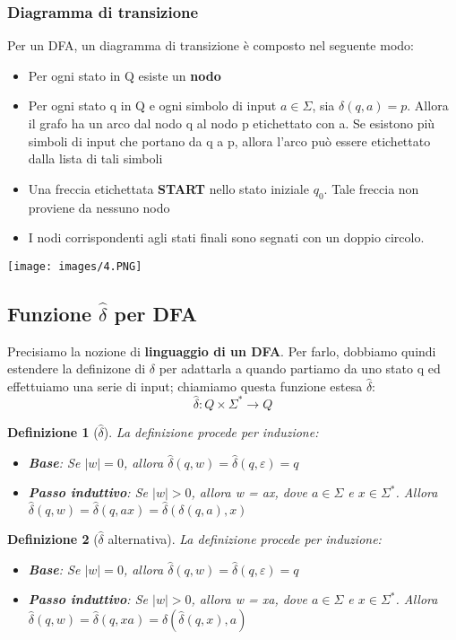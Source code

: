\documentclass[12pt]{article}
\newtheorem{Definizione}{Definizione}[subsection]
\begin{document}
\subsubsection{Diagramma di transizione}
Per un DFA, un diagramma di transizione è composto nel seguente modo:
\begin{itemize}
    \item Per ogni stato in Q esiste un \textbf{nodo}
    \item Per ogni stato q in Q e ogni simbolo di input $a \in \Sigma$, sia $\delta(q, a) = p$. Allora il grafo ha un arco dal nodo q al nodo p etichettato con a. Se esistono più simboli di input che portano da q a p, allora l'arco può essere etichettato dalla lista di tali simboli
    \item Una freccia etichettata \textbf{START} nello stato iniziale $q_0$. Tale freccia non proviene da nessuno nodo
    \item I nodi corrispondenti agli stati finali sono segnati con un doppio circolo.
\end{itemize}
\begin{center}
    \texttt{[image: images/4.PNG]}
\end{center}
\subsection{Funzione $\hat{\delta}$ per DFA}
Precisiamo la nozione di \textbf{linguaggio di un DFA}. Per farlo, dobbiamo quindi estendere la definizone di $\delta$ per adattarla a quando partiamo da uno stato q ed effettuiamo una serie di input; chiamiamo questa funzione estesa $\hat{\delta}$:
$$\hat{\delta}: Q \times \Sigma^* \to Q$$
\begin{Definizione}[$\hat{\delta}$]
La definizione procede per induzione:
\begin{itemize}
    \item \textbf{Base}: Se $|w| = 0$, allora $\hat{\delta}(q,w) = \hat{\delta}(q, \varepsilon) = q$
    \item  \textbf{Passo induttivo}: Se $|w| > 0$, allora w = ax, dove $a \in \Sigma$ e $x \in \Sigma^*$.
    Allora $\hat{\delta}(q, w) = \hat{\delta}(q, ax) = \hat{\delta}(\delta(q,a),x)$
\end{itemize}
\end{Definizione}
\begin{Definizione}[$\hat{\delta}$ alternativa]
La definizione procede per induzione:
\begin{itemize}
    \item \textbf{Base}: Se $|w| = 0$, allora $\hat{\delta}(q,w) = \hat{\delta}(q, \varepsilon) = q$
    \item  \textbf{Passo induttivo}: Se $|w| > 0$, allora w = xa, dove $a \in \Sigma$ e $x \in \Sigma^*$.
    Allora $\hat{\delta}(q, w) = \hat{\delta}(q, xa) = \delta(\hat{\delta}(q,x),a)$
\end{itemize}
\end{Definizione}
\end{document}
